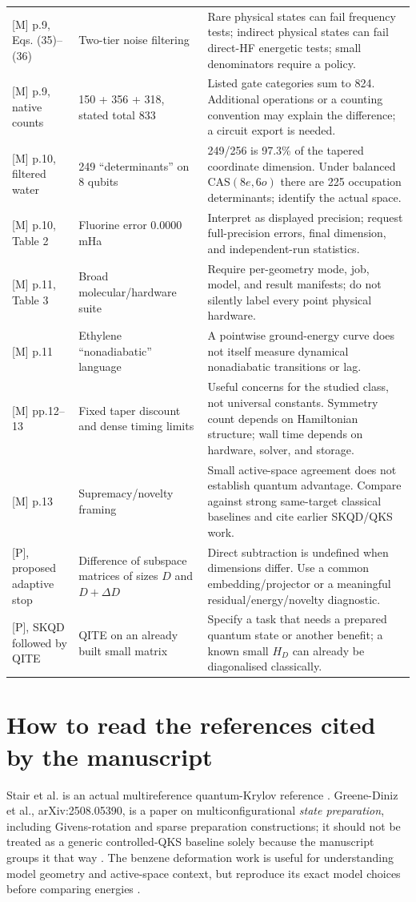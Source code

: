 \documentclass[11pt,a4paper,oneside]{report}
\begin{document}
\begin{longtable}{@{}p{27mm}p{48mm}p{75mm}@{}}
{[M]} p.9, Eqs. (35)--(36) & Two-tier noise filtering & Rare physical states can fail frequency tests; indirect physical states can fail direct-HF energetic tests; small denominators require a policy.\\
{[M]} p.9, native counts & 150 + 356 + 318, stated total 833 & Listed gate categories sum to 824. Additional operations or a counting convention may explain the difference; a circuit export is needed.\\
{[M]} p.10, filtered water & 249 ``determinants'' on 8 qubits & 249/256 is 97.3\% of the tapered coordinate dimension. Under balanced CAS$(8e,6o)$ there are 225 occupation determinants; identify the actual space.\\
{[M]} p.10, Table 2 & Fluorine error $0.0000$ mHa & Interpret as displayed precision; request full-precision errors, final dimension, and independent-run statistics.\\
{[M]} p.11, Table 3 & Broad molecular/hardware suite & Require per-geometry mode, job, model, and result manifests; do not silently label every point physical hardware.\\
{[M]} p.11 & Ethylene ``nonadiabatic'' language & A pointwise ground-energy curve does not itself measure dynamical nonadiabatic transitions or lag.\\
{[M]} pp.12--13 & Fixed taper discount and dense timing limits & Useful concerns for the studied class, not universal constants. Symmetry count depends on Hamiltonian structure; wall time depends on hardware, solver, and storage.\\
{[M]} p.13 & Supremacy/novelty framing & Small active-space agreement does not establish quantum advantage. Compare against strong same-target classical baselines and cite earlier SKQD/QKS work.\\
{[P]}, proposed adaptive stop & Difference of subspace matrices of sizes $D$ and $D+\Delta D$ & Direct subtraction is undefined when dimensions differ. Use a common embedding/projector or a meaningful residual/energy/novelty diagnostic.\\
{[P]}, SKQD followed by QITE & QITE on an already built small matrix & Specify a task that needs a prepared quantum state or another benefit; a known small $H_D$ can already be diagonalised classically.\\\bottomrule
\end{longtable}

\section*{How to read the references cited by the manuscript}
Stair et al. is an actual multireference quantum-Krylov reference \cite{stair}. Greene-Diniz et al., arXiv:2508.05390, is a paper on multiconfigurational \emph{state preparation}, including Givens-rotation and sparse preparation constructions; it should not be treated as a generic controlled-QKS baseline solely because the manuscript groups it that way \cite{greene}. The benzene deformation work is useful for understanding model geometry and active-space context, but reproduce its exact model choices before comparing energies \cite{sennane}.
\end{document}
